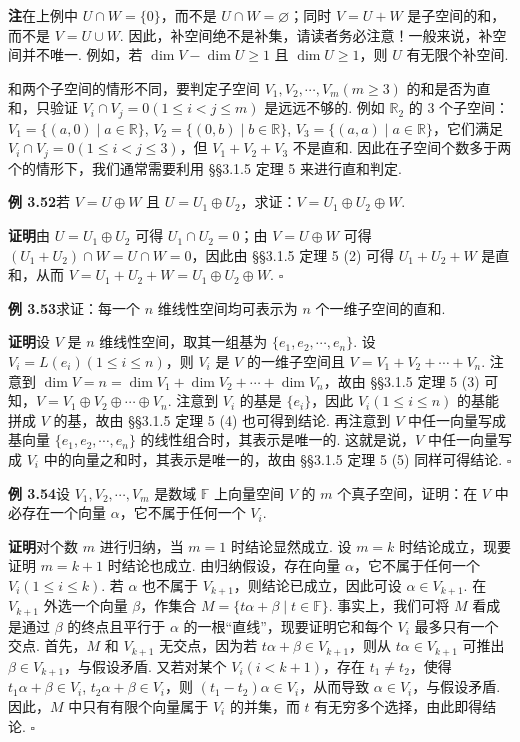\documentclass[UTF8, 12pt, fontset=fandol, oneside]{ctexart}
\begin{document}
\noindent\textbf{注}\quad 在上例中 $U\cap W=\{0\}$，而不是 $U\cap W=\varnothing$；同时 $V=U+W$ 是子空间的和，而不是 $V=U\cup W$. 因此，补空间绝不是补集，请读者务必注意！一般来说，补空间并不唯一. 例如，若 $\dim V-\dim U\ge 1$ 且 $\dim U\ge 1$，则 $U$ 有无限个补空间.

和两个子空间的情形不同，要判定子空间 $V_1,V_2,\cdots,V_m(m\ge 3)$ 的和是否为直和，只验证 $V_i\cap V_j=0(1\le i<j\le m)$ 是远远不够的. 例如 $\mathbb{R}_2$ 的 3 个子空间：$V_1=\{(a,0)\mid a\in\mathbb{R}\}$, $V_2=\{(0,b)\mid b\in\mathbb{R}\}$, $V_3=\{(a,a)\mid a\in\mathbb{R}\}$，它们满足 $V_i\cap V_j=0(1\le i<j\le 3)$，但 $V_1+V_2+V_3$ 不是直和. 因此在子空间个数多于两个的情形下，我们通常需要利用 §§3.1.5 定理 5 来进行直和判定.

\noindent\textbf{例 3.52}\quad 若 $V=U\oplus W$ 且 $U=U_1\oplus U_2$，求证：$V=U_1\oplus U_2\oplus W$.

\noindent\textbf{证明}\quad 由 $U=U_1\oplus U_2$ 可得 $U_1\cap U_2=0$；由 $V=U\oplus W$ 可得 $(U_1+U_2)\cap W=U\cap W=0$，因此由 §§3.1.5 定理 5 (2) 可得 $U_1+U_2+W$ 是直和，从而 $V=U_1+U_2+W=U_1\oplus U_2\oplus W$. $\square$

\noindent\textbf{例 3.53}\quad 求证：每一个 $n$ 维线性空间均可表示为 $n$ 个一维子空间的直和.

\noindent\textbf{证明}\quad 设 $V$ 是 $n$ 维线性空间，取其一组基为 $\{e_1,e_2,\cdots,e_n\}$. 设 $V_i=L(e_i)(1\le i\le n)$，则 $V_i$ 是 $V$ 的一维子空间且 $V=V_1+V_2+\cdots+V_n$. 注意到 $\dim V=n=\dim V_1+\dim V_2+\cdots+\dim V_n$，故由 §§3.1.5 定理 5 (3) 可知，$V=V_1\oplus V_2\oplus\cdots\oplus V_n$. 注意到 $V_i$ 的基是 $\{e_i\}$，因此 $V_i(1\le i\le n)$ 的基能拼成 $V$ 的基，故由 §§3.1.5 定理 5 (4) 也可得到结论. 再注意到 $V$ 中任一向量写成基向量 $\{e_1,e_2,\cdots,e_n\}$ 的线性组合时，其表示是唯一的. 这就是说，$V$ 中任一向量写成 $V_i$ 中的向量之和时，其表示是唯一的，故由 §§3.1.5 定理 5 (5) 同样可得结论. $\square$

\noindent\textbf{例 3.54}\quad 设 $V_1,V_2,\cdots,V_m$ 是数域 $\mathbb{F}$ 上向量空间 $V$ 的 $m$ 个真子空间，证明：在 $V$ 中必存在一个向量 $\alpha$，它不属于任何一个 $V_i$.

\noindent\textbf{证明}\quad 对个数 $m$ 进行归纳，当 $m=1$ 时结论显然成立. 设 $m=k$ 时结论成立，现要证明 $m=k+1$ 时结论也成立. 由归纳假设，存在向量 $\alpha$，它不属于任何一个 $V_i(1\le i\le k)$. 若 $\alpha$ 也不属于 $V_{k+1}$，则结论已成立，因此可设 $\alpha\in V_{k+1}$. 在 $V_{k+1}$ 外选一个向量 $\beta$，作集合 $M=\{t\alpha+\beta\mid t\in\mathbb{F}\}$. 事实上，我们可将 $M$ 看成是通过 $\beta$ 的终点且平行于 $\alpha$ 的一根“直线”，现要证明它和每个 $V_i$ 最多只有一个交点. 首先，$M$ 和 $V_{k+1}$ 无交点，因为若 $t\alpha+\beta\in V_{k+1}$，则从 $t\alpha\in V_{k+1}$ 可推出 $\beta\in V_{k+1}$，与假设矛盾. 又若对某个 $V_i(i<k+1)$，存在 $t_1\ne t_2$，使得 $t_1\alpha+\beta\in V_i$, $t_2\alpha+\beta\in V_i$，则 $(t_1-t_2)\alpha\in V_i$，从而导致 $\alpha\in V_i$，与假设矛盾. 因此，$M$ 中只有有限个向量属于 $V_i$ 的并集，而 $t$ 有无穷多个选择，由此即得结论. $\square$
\end{document}
